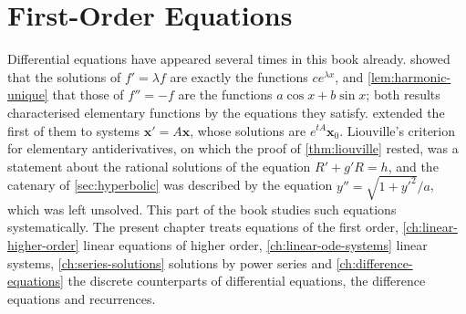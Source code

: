 \chapter{First-Order Equations}
\label{ch:first-order-equations}


Differential equations have appeared several times in this book already.  showed that the solutions of $f'=\lambda f$ are exactly the functions $ce^{\lambda x}$, and \cref{lem:harmonic-unique} that those of $f''=-f$ are the functions $a\cos x+b\sin x$; both results characterised elementary functions by the equations they satisfy.  extended the first of them to systems $\mathbf x'=A\mathbf x$, whose solutions are $e^{tA}\mathbf x_0$. Liouville's criterion for elementary antiderivatives, on which the proof of \cref{thm:liouville} rested, was a statement about the rational solutions of the equation $R'+g'R=h$, and the catenary of \cref{sec:hyperbolic} was described by the equation $y''=\sqrt{1+y'^2}/a$, which was left unsolved. This part of the book studies such equations systematically. The present chapter treats equations of the first order, \cref{ch:linear-higher-order} linear equations of higher order, \cref{ch:linear-ode-systems} linear systems, \cref{ch:series-solutions} solutions by power series and \cref{ch:difference-equations} the discrete counterparts of differential equations, the difference equations and recurrences.

